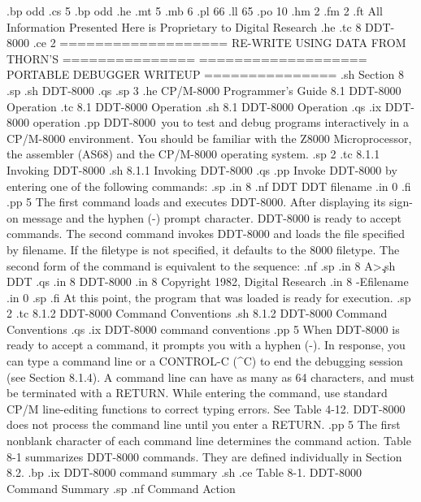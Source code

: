 .bp odd
.cs 5
.bp odd
.he
.mt 5
.mb 6
.pl 66
.ll 65
.po 10
.hm 2
.fm 2
.ft All Information Presented Here is Proprietary to Digital Research
.he 
.tc 8  DDT-8000
.ce 2
=================== RE-WRITE USING DATA FROM THORN'S ===============
=================== PORTABLE DEBUGGER WRITEUP        ===============
.sh
Section 8
.sp
.sh
DDT-8000 
.qs
.sp 3
.he CP/M-8000 Programmer's Guide                   8.1  DDT-8000 Operation
.tc    8.1  DDT-8000 Operation
.sh
8.1  DDT-8000 Operation
.qs
.ix DDT-8000 operation
.pp 
DDT-8000\  \allows you to test and debug programs
interactively in a CP/M-8000 environment.  You should be familiar with 
the Z8000 Microprocessor, the assembler (AS68) and the CP/M-8000 operating 
system.
.sp 2
.tc         8.1.1  Invoking DDT-8000
.sh
8.1.1  Invoking DDT-8000
.qs
.pp 
Invoke DDT-8000 by entering one of the following commands:
.sp
.in 8
.nf
DDT
DDT filename
.in 0
.fi
.pp 5
The first command loads and executes DDT-8000.  After
displaying its sign-on message and the hyphen (-) prompt
character.   DDT-8000 is ready to accept commands.  The second
command invokes DDT-8000 and loads the file specified by filename.
If the filetype is not specified, it defaults to the 8000 filetype.
The second form of the command is equivalent to the sequence: 
.nf
.sp
.in 8   
A>\c
.sh
DDT
.qs
.in 8
DDT-8000 
.in 8
Copyright 1982, Digital Research
.in 8
-Efilename
.in 0
.sp
.fi
At this point, the program that was loaded is ready for execution.
.sp 2
.tc         8.1.2  DDT-8000 Command Conventions
.sh
8.1.2  DDT-8000 Command Conventions
.qs
.ix DDT-8000 command conventions
.pp 5
When DDT-8000 is ready to accept a command, it prompts you with a
hyphen (-).  In response, you can type a command line or a CONTROL-C 
(^C) to end the debugging session (see Section 8.1.4).  A command 
line can have as many as 64 characters, and must be terminated with a 
RETURN.  While entering the command, use standard CP/M line-editing 
functions to correct typing errors.  See Table 4-12.  DDT-8000 does 
not process the command line until you enter a RETURN.
.pp 5
The first nonblank character of each command line determines the command 
action.  
Table 8-1 summarizes DDT-8000 commands.  They are defined 
individually in Section 8.2.
.bp
.ix DDT-8000 command summary
.sh
.ce
Table 8-1.  DDT-8000 Command Summary
.sp
.nf
     Command                        Action

